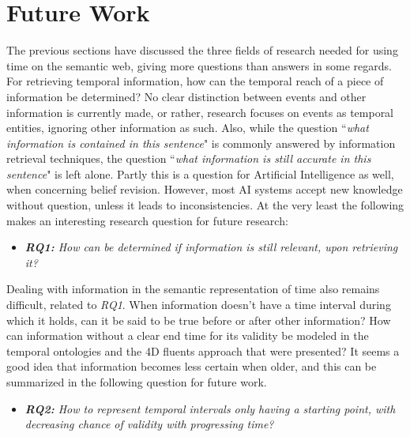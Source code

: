 \documentclass{llncs}
\begin{document}

\section{Future Work}
\label{sec:discussion}
The previous sections have discussed the three fields of research needed for using time on the semantic web, giving more questions than answers in some regards. For retrieving temporal information, how can the temporal reach of a piece of information be determined? No clear distinction between events and other information is currently made, or rather, research focuses on events as temporal entities, ignoring other information as such. Also, while the question ``\emph{what information is contained in this sentence}" is commonly answered by information retrieval techniques, the question ``\emph{what information is still accurate in this sentence}" is left alone. Partly this is a question for Artificial Intelligence as well, when concerning belief revision. However, most AI systems accept new knowledge without question, unless it leads to inconsistencies. At the very least the following makes an interesting research question for future research:
\begin{itemize}
\item \emph{\textbf{RQ1:} How can be determined if information is still relevant, upon retrieving it?}
\end{itemize}

Dealing with information in the semantic representation of time also remains difficult, related to \emph{RQ1}. When information doesn't have a time interval during which it holds, can it be said to be true before or after other information? How can information without a clear end time for its validity be modeled in the temporal ontologies and the 4D fluents approach that were presented? It seems a good idea that information becomes less certain when older, and this can be summarized in the following question for future work.
\begin{itemize}
\item \emph{\textbf{RQ2:} How to represent temporal intervals only having a starting point, with decreasing chance of validity with progressing time?}
\end{itemize}
\end{document}
